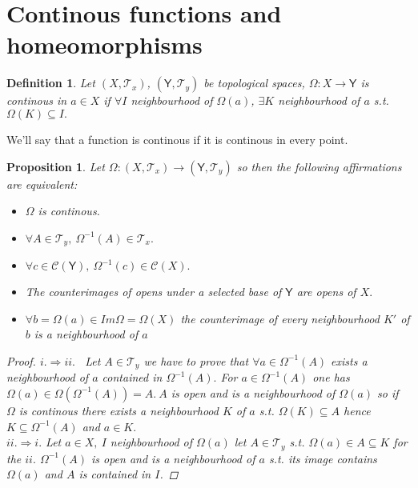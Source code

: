 \documentclass{article}
\newtheorem{proposition}{Proposition}
\newtheorem{definition}{Definition}
\begin{document}
    \section*{Continous functions and homeomorphisms}
    \begin{definition}
        Let $(X, \mathcal{T}_x)$, $(\mathsf{Y}, \mathcal{T}_y)$ be topological spaces, $\varOmega : X \rightarrow \mathsf{Y}$ is continous in $a\in X$ if $\forall I $ neighbourhood of $\varOmega(a)$, $\exists K$ neighbourhood of $a$ s.t. $\varOmega(K) \subseteq I.$  
    \end{definition}
    We'll say that a function is continous if it is continous in every point.
    \begin{proposition}
        Let $\varOmega:(X, \mathcal{T}_x) \rightarrow (\mathsf{Y}, \mathcal{T}_y)$ so then the following affirmations are equivalent:
        \begin{itemize}
            \item[i.] $\varOmega$ is continous.
            \item[ii.] $\forall A \in \mathcal{T}_y,\ \varOmega^{-1}(A) \in \mathcal{T}_x.$
            \item[iii.] $\forall c \in \mathcal{C}(\mathsf{Y}), \ \varOmega^{-1}(c) \in \mathcal{C}(X).$
            \item[iv.] The counterimages of opens under a selected base of $\mathsf{Y}$ are opens of $X.$
            \item[v.] $\forall b = \varOmega(a) \in Im\varOmega = \varOmega(X)$ the counterimage  of every neighbourhood $K'$ of $b$ is a neighbourhood of $a$      
        \end{itemize}
        \begin{proof}
            $i. \Rightarrow ii.$ \ Let $A \in \mathcal{T}_y$ we have to prove that $\forall a \in \varOmega^{-1}(A)$ exists a neighbourhood of $a$ contained in $\varOmega^{-1}(A).$ For $a \in \varOmega^{-1}(A)$ one has $\varOmega(a) \in \varOmega(\varOmega^{-1}(A)) = A.\ A$ is open and is a neighbourhood of $\varOmega(a)$ so if $\varOmega$ is continous there exists a neighbourhood $K$ of $a$ s.t. 
            $\varOmega(K) \subseteq A$ hence $K \subseteq \varOmega^{-1}(A)$ and $a \in K.$ \\
            $ii. \Rightarrow i.$ Let $a \in X, \ I$ neighbourhood of $\varOmega(a)$ let $A \in \mathcal{T}_y$ s.t. $\varOmega(a) \in A \subseteq K$ for the $ii.$ $\varOmega^{-1}(A)$ is open and is a neighbourhood of $a$ s.t. its image contains $\varOmega(a)$ and $A$ is contained in $I$.
        \end{proof}
    \end{proposition}
\end{document}
